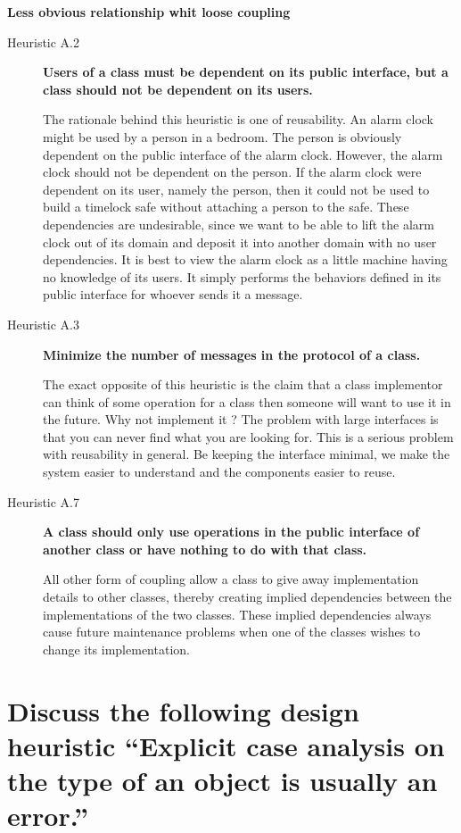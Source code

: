 \textbf{Less obvious relationship whit loose coupling}

\begin{description}
\item[Heuristic A.2] \textbf{Users of a class must be dependent on its public interface, but a class should not be dependent on its users.}

The rationale behind this heuristic is one of reusability. An alarm clock might be used by a person in a bedroom. The person is obviously dependent on the public interface of the alarm clock. However, the alarm clock should not be dependent on the person. If the alarm clock were dependent on its user, namely the person, then it could not be used to build a timelock safe without attaching a person to the safe. These dependencies are undesirable, since we want to be able to lift the alarm clock out of its domain and deposit it into another domain with no user dependencies. It is best to view the alarm clock as a little machine having no knowledge of its users. It simply performs the behaviors defined in its public interface for whoever sends it a message.

\item[Heuristic A.3] \textbf{Minimize the number of messages in the protocol of a class.}

The exact opposite of this heuristic is the claim that a class implementor can think of some operation for a class then someone will want to use it in the future.  Why not implement it ?
The problem with large interfaces is that you can never find what you are looking for. This is a serious problem with reusability in general. Be keeping the interface minimal, we make the system easier to understand and the components easier to reuse.

\item[Heuristic A.7] \textbf{A class should only use operations in the public interface of another class or have nothing to do with that class.}

All other form of coupling allow a class to give away implementation details to other classes, thereby creating implied dependencies between the implementations of the two classes. These implied dependencies always cause future maintenance problems when one of the classes wishes to change its implementation.


\end{description}


\section{Discuss the following design heuristic “Explicit case analysis on the type of an object is usually an error.”}


